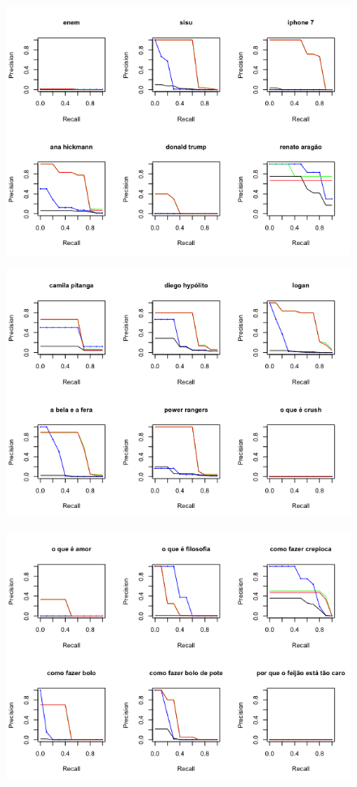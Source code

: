 \documentclass{article}
\begin{document}
\begin{figure}
\centering
\includegraphics[width=\linewidth]{queries_13_to_18.png}
\end{figure}

\begin{figure}
\centering
\includegraphics[width=\linewidth]{queries_19_to_24.png}
\end{figure}

\begin{figure}
\centering
\includegraphics[width=\linewidth]{queries_25_to_30.png}
\end{figure}
\end{document}
